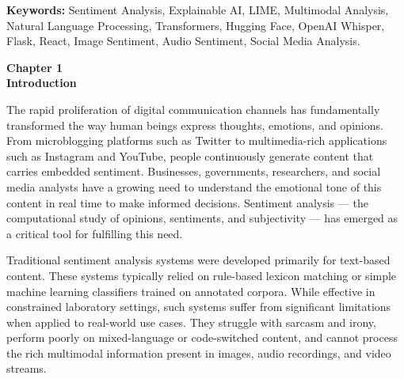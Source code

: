 \documentclass[12pt, a4paper]{report}
\begin{document}
\vspace{0.5cm}
\noindent\textbf{Keywords:} Sentiment Analysis, Explainable AI, LIME, Multimodal Analysis, Natural Language Processing, Transformers, Hugging Face, OpenAI Whisper, Flask, React, Image Sentiment, Audio Sentiment, Social Media Analysis.

\newpage
\tableofcontents


\newpage
\listoffigures
{}


\newpage
\listoftables
{}


\newpage
{}

\newpage
\thispagestyle{empty}

\vspace*{\fill}
\begin{center}
{\Huge \textbf{Chapter 1}}\\[1cm]
{\Huge \textbf{Introduction}}
\end{center}
\vspace*{\fill}

\newpage

The rapid proliferation of digital communication channels has fundamentally transformed the way human beings express thoughts, emotions, and opinions. From microblogging platforms such as Twitter to multimedia-rich applications such as Instagram and YouTube, people continuously generate content that carries embedded sentiment. Businesses, governments, researchers, and social media analysts have a growing need to understand the emotional tone of this content in real time to make informed decisions. Sentiment analysis --- the computational study of opinions, sentiments, and subjectivity --- has emerged as a critical tool for fulfilling this need.

Traditional sentiment analysis systems were developed primarily for text-based content. These systems typically relied on rule-based lexicon matching or simple machine learning classifiers trained on annotated corpora. While effective in constrained laboratory settings, such systems suffer from significant limitations when applied to real-world use cases. They struggle with sarcasm and irony, perform poorly on mixed-language or code-switched content, and cannot process the rich multimodal information present in images, audio recordings, and video streams.
\end{document}
